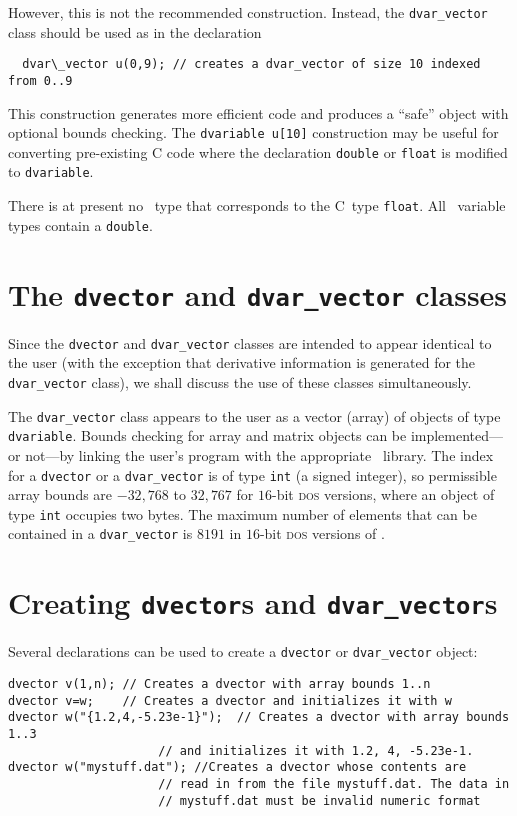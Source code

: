 \documentclass{admbmanual}
\begin{document}
However, this is not the recommended construction. Instead, the 
\texttt{dvar\_vector} class should be used as in the declaration 
\begin{lstlisting}
  dvar\_vector u(0,9); // creates a dvar_vector of size 10 indexed from 0..9
\end{lstlisting}
This construction generates more efficient code and produces
 a ``safe'' object with optional bounds
checking. The \texttt{dvariable u[10]} construction may be useful for
converting pre-existing C code where the declaration \texttt{double} or
\texttt{float} is modified to \texttt{dvariable}. 

There is at present no \scAD\ type that corresponds to the C~type \texttt{float}. 
All \scAD\ variable types contain a \texttt{double}. 


\section{The \texttt{dvector} and \texttt{dvar\_vector} classes}

Since the \texttt{dvector} and \texttt{dvar\_vector} classes are intended to
appear identical to the user (with the exception that derivative
information is generated for the \texttt{dvar\_vector} class), we shall
discuss the use of these classes simultaneously.

 
The \texttt{dvar\_vector} class appears to the user as a vector (array)
of objects of type \texttt{dvariable}. 
Bounds checking for array and matrix objects
can be implemented---or not---by linking the user's program with
the appropriate \scAD\ library. The index for a \texttt{dvector}
or a \texttt{dvar\_vector}
is of type \texttt{int} (a signed integer), so permissible array bounds
are $-32,768$ to $32,767$ for $16$-bit \textsc{dos} versions, where an object of type \texttt{int} 
occupies two bytes.  The maximum number of elements that can be contained
in a \texttt{dvar\_vector} is $8191$ in $16$-bit \textsc{dos} versions of \scAD.


\section{Creating \texttt{dvector}s and \texttt{dvar\_vector}s}

Several declarations can be used to create
a \texttt{dvector} or \texttt{dvar\_vector} object:
\begin{lstlisting}
dvector v(1,n); // Creates a dvector with array bounds 1..n
dvector v=w;    // Creates a dvector and initializes it with w
dvector w("{1.2,4,-5.23e-1}");  // Creates a dvector with array bounds 1..3
                     // and initializes it with 1.2, 4, -5.23e-1.
dvector w("mystuff.dat"); //Creates a dvector whose contents are
                     // read in from the file mystuff.dat. The data in
                     // mystuff.dat must be invalid numeric format 
\end{lstlisting}
\end{document}
